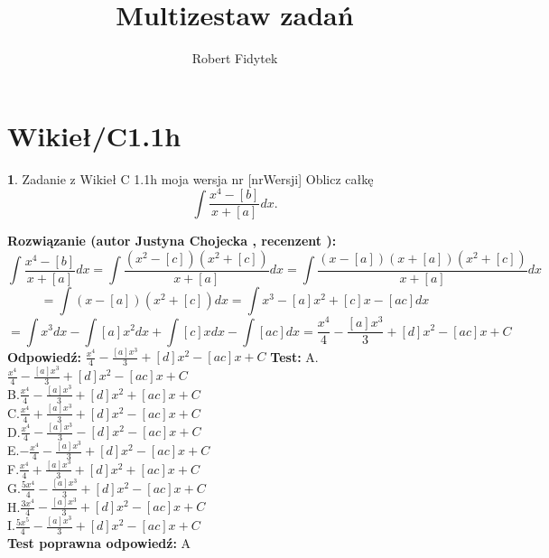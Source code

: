 \documentclass[12pt, a4paper]{article}
\title{Multizestaw zadań}
\author{Robert Fidytek}
\date{}
\theoremstyle{definition} %
\newtheorem{zad}{}
\newcommand{\kategoria}[1]{\section{#1}} %
\newcommand{\zadStart}[1]{\begin{zad}#1\newline} %
\newcommand{\zadStop}{\end{zad}}   %
\newcommand{\rozwStart}[2]{\noindent \textbf{Rozwiązanie (autor #1 , recenzent #2): }\newline} %
\newcommand{\rozwStop}{\newline}                                            %
\newcommand{\odpStart}{\noindent \textbf{Odpowiedź:}\newline}    %
\newcommand{\odpStop}{\newline}                                             %
\newcommand{\testStart}{\noindent \textbf{Test:}\newline} %
\newcommand{\testStop}{\newline} %
\newcommand{\kluczStart}{\noindent \textbf{Test poprawna odpowiedź:}\newline} %
\newcommand{\kluczStop}{\newline} %
\begin{document}
\maketitle
\kategoria{Wikieł/C1.1h}
\zadStart{Zadanie z Wikieł C 1.1h moja wersja nr [nrWersji]}
Oblicz całkę $$\int \frac{x^{4}-[b]}{x+[a]} dx.$$
\zadStop
\rozwStart{Justyna Chojecka}{}
$$\int \frac{x^{4}-[b]}{x+[a]} dx=\int \frac{(x^{2}-[c])(x^{2}+[c])}{x+[a]}dx=\int \frac{(x-[a])(x+[a])(x^{2}+[c])}{x+[a]}dx$$$$=\int (x-[a])(x^{2}+[c])dx=\int x^{3}-[a]x^{2}+[c]x-[ac]dx$$$$=\int x^{3}dx-\int [a]x^{2}dx+\int[c]xdx-\int [ac]dx=\frac{x^{4}}{4}-\frac{[a]x^{3}}{3}+[d]x^{2}-[ac]x+C$$
\rozwStop
\odpStart
$\frac{x^{4}}{4}-\frac{[a]x^{3}}{3}+[d]x^{2}-[ac]x+C$
\odpStop
\testStart
A.$\frac{x^{4}}{4}-\frac{[a]x^{3}}{3}+[d]x^{2}-[ac]x+C$\\
B.$\frac{x^{4}}{4}-\frac{[a]x^{3}}{3}+[d]x^{2}+[ac]x+C$\\
C.$\frac{x^{4}}{4}+\frac{[a]x^{3}}{3}+[d]x^{2}-[ac]x+C$\\
D.$\frac{x^{4}}{4}-\frac{[a]x^{3}}{3}-[d]x^{2}-[ac]x+C$\\
E.$-\frac{x^{4}}{4}-\frac{[a]x^{3}}{3}+[d]x^{2}-[ac]x+C$\\
F.$\frac{x^{4}}{4}+\frac{[a]x^{3}}{3}+[d]x^{2}+[ac]x+C$\\
G.$\frac{5x^{4}}{4}-\frac{[a]x^{3}}{3}+[d]x^{2}-[ac]x+C$\\
H.$\frac{3x^{4}}{4}-\frac{[a]x^{3}}{3}+[d]x^{2}-[ac]x+C$\\
I.$\frac{5x^{5}}{4}-\frac{[a]x^{3}}{3}+[d]x^{2}-[ac]x+C$\\
\testStop
\kluczStart
A
\kluczStop
\end{document}
